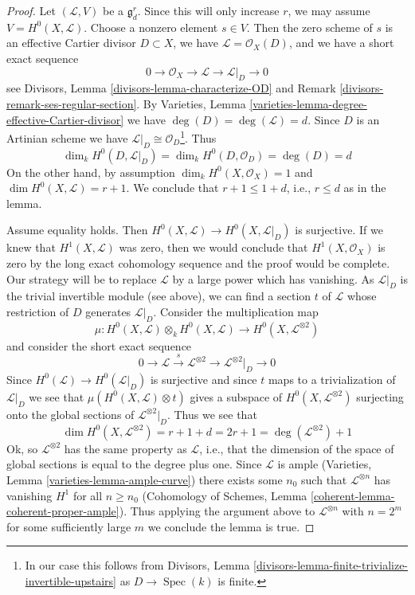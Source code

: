 \documentclass{stacks-project}
\theoremstyle{plain}
\theoremstyle{definition}
\theoremstyle{remark}
\numberwithin{equation}{subsection}
\def\Spec{\mathop{\mathrm{Spec}}}
\begin{document}
\begin{proof}
Let $(\mathcal{L}, V)$ be a $\mathfrak g^r_d$. Since this will only
increase $r$, we may assume $V = H^0(X, \mathcal{L})$. Choose a
nonzero element $s \in V$.  Then the zero scheme of $s$ is an effective Cartier
divisor $D \subset X$, we have $\mathcal{L} = \mathcal{O}_X(D)$, and
we have a short exact sequence
$$
0 \to \mathcal{O}_X \to \mathcal{L} \to \mathcal{L}|_D \to 0
$$
see Divisors, Lemma \ref{divisors-lemma-characterize-OD} and
Remark \ref{divisors-remark-ses-regular-section}.
By Varieties, Lemma \ref{varieties-lemma-degree-effective-Cartier-divisor}
we have $\deg(D) = \deg(\mathcal{L}) = d$.
Since $D$ is an Artinian scheme we have
$\mathcal{L}|_D \cong \mathcal{O}_D$\footnote{In our case this
follows from Divisors, Lemma
\ref{divisors-lemma-finite-trivialize-invertible-upstairs}
as $D \to \Spec(k)$ is finite.}.
Thus
$$
\dim_k H^0(D, \mathcal{L}|_D) = \dim_k H^0(D, \mathcal{O}_D) = \deg(D) = d
$$
On the other hand, by assumption
$\dim_k H^0(X, \mathcal{O}_X) = 1$ and $\dim H^0(X, \mathcal{L}) = r + 1$.
We conclude that $r + 1 \leq 1 + d$, i.e., $r \leq d$ as in the lemma.

\medskip\noindent
Assume equality holds. Then
$H^0(X, \mathcal{L}) \to H^0(X, \mathcal{L}|_D)$ is surjective.
If we knew that $H^1(X, \mathcal{L})$ was zero, then we would
conclude that $H^1(X, \mathcal{O}_X)$ is zero by the long exact
cohomology sequence and the proof would
be complete. Our strategy will be to replace $\mathcal{L}$ by a
large power which has vanishing. As $\mathcal{L}|_D$ is the
trivial invertible module (see above), we can
find a section $t$ of $\mathcal{L}$ whose restriction
of $D$ generates $\mathcal{L}|_D$.
Consider the multiplication map
$$
\mu :
H^0(X, \mathcal{L}) \otimes_k H^0(X, \mathcal{L})
\longrightarrow
H^0(X, \mathcal{L}^{\otimes 2})
$$
and consider the short exact sequence
$$
0 \to \mathcal{L} \xrightarrow{s}
\mathcal{L}^{\otimes 2} \to \mathcal{L}^{\otimes 2}|_D \to 0
$$
Since $H^0(\mathcal{L}) \to H^0(\mathcal{L}|_D)$ is surjective and since
$t$ maps to a trivialization of $\mathcal{L}|_D$ we see that
$\mu(H^0(X, \mathcal{L}) \otimes t)$ gives a subspace of
$H^0(X, \mathcal{L}^{\otimes 2})$ surjecting onto the global sections of
$\mathcal{L}^{\otimes 2}|_D$. Thus we see that
$$
\dim H^0(X, \mathcal{L}^{\otimes 2}) = r + 1 + d = 2r + 1 =
\deg(\mathcal{L}^{\otimes 2}) + 1
$$
Ok, so $\mathcal{L}^{\otimes 2}$ has the same property as $\mathcal{L}$, i.e.,
that the dimension of the space of global sections is equal to the
degree plus one. Since $\mathcal{L}$ is ample
(Varieties, Lemma \ref{varieties-lemma-ample-curve})
there exists some $n_0$ such that $\mathcal{L}^{\otimes n}$
has vanishing $H^1$ for all $n \geq n_0$
(Cohomology of Schemes, Lemma \ref{coherent-lemma-coherent-proper-ample}).
Thus applying the argument above to $\mathcal{L}^{\otimes n}$
with $n = 2^m$ for some sufficiently large $m$ we conclude the
lemma is true.
\end{proof}
\end{document}
